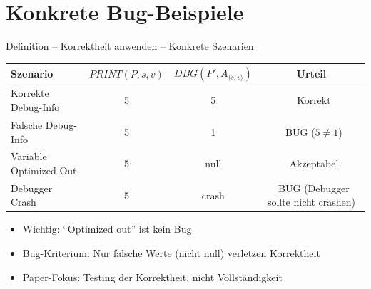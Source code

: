 ﻿\documentclass{beamer}
\newcommand{\dingcheck}{{\color{moderngreen}\ding{52}}}
\newcommand{\dingcross}{{\color{modernred}\ding{54}}}
\begin{document}
\section{Konkrete Bug-Beispiele}

\begin{frame}{Definition -- Korrektheit anwenden -- Konkrete Szenarien}
  \begin{center}
    \footnotesize
    \begin{tabular}{|l|c|c|c|}
      \hline
      \textbf{Szenario} & $\mathit{PRINT}(P,s,v)$ & $\mathit{DBG}(P', A_{\langle s,v\rangle})$ & \textbf{Urteil} \\
      \hline
      Korrekte Debug-Info & 5 & 5 & \dingcheck\ Korrekt \\
      \hline
      Falsche Debug-Info & 5 & 1 & \dingcross\ BUG ($5 \neq 1$) \\
      \hline
      Variable Optimized Out & 5 & null & \dingcheck\ Akzeptabel \\
      \hline
      Debugger Crash & 5 & crash & \dingcross\ BUG (Debugger sollte nicht crashen) \\
      \hline
    \end{tabular}
  \end{center}
  \vspace{0.3cm}
  \begin{itemize}
    \item Wichtig: ``Optimized out'' ist kein Bug
    \item Bug-Kriterium: Nur falsche Werte (nicht null) verletzen Korrektheit
    \item Paper-Fokus: Testing der Korrektheit, nicht Vollst\"andigkeit
  \end{itemize}
\end{frame}
\end{document}
